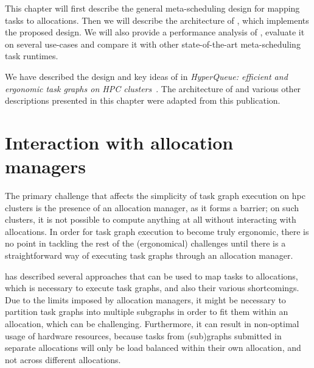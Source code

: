 This chapter will first describe the general meta-scheduling design for mapping tasks to
allocations. Then we will describe the architecture of \hyperqueue{}, which implements the
proposed design. We will also provide a performance analysis of \hyperqueue{}, evaluate it
on several use-cases and compare it with other state-of-the-art meta-scheduling task runtimes.


We have described the design and key ideas of \hyperqueue{} in
\emph{HyperQueue: efficient and ergonomic task graphs on HPC clusters}~\cite{hyperqueue}.
The architecture of \hyperqueue{} and various other descriptions presented in this chapter were adapted from this publication.


\section{Interaction with allocation managers}
The primary challenge that affects the simplicity of task graph execution on \gls{hpc}
clusters is the presence of an allocation manager, as it forms a barrier; on such clusters, it is
not possible to compute anything at all without interacting with allocations. In order for task
graph execution to become truly ergonomic, there is no point in tackling the rest of the
(ergonomical) challenges until there is a straightforward way of executing task graphs through an
allocation manager.

 has described several approaches that can be used to map tasks to
allocations, which is necessary to execute task graphs, and also their various shortcomings. Due to
the limits imposed by allocation managers, it might be necessary to partition task graphs into
multiple subgraphs in order to fit them within an allocation, which can be challenging.
Furthermore, it can result in non-optimal usage of hardware resources, because tasks from
(sub)graphs submitted in separate allocations will only be load balanced within their own
allocation, and not across different allocations.

